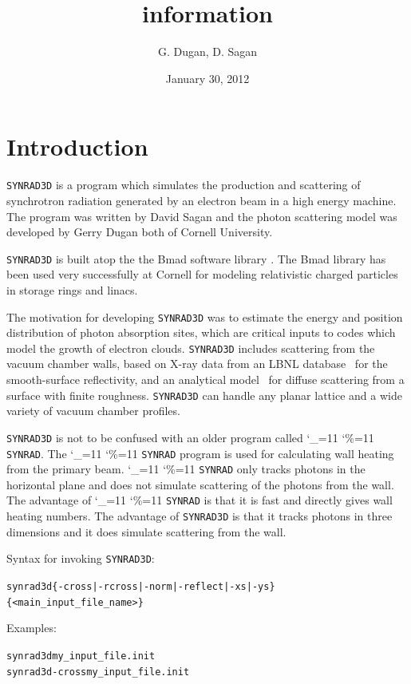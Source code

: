 \documentclass[11pt]{article}
\title{ \srthree information}
\author{G. Dugan, D. Sagan}
\date{January 30, 2012}
\newcommand{\srthree}{\texttt{SYNRAD3D}\xspace}
\newcommand\ttcmd{\begingroup\catcode`\_=11 \catcode`\%=11 \dottcmd}
\newcommand\dottcmd[1]{\texttt{#1}\endgroup}
\newcommand{\vn}{\ttcmd}
\newlength{\ExBeg}
\newlength{\ExEnd}
\newenvironment{example}
  {\vspace{\ExBeg} \begin{alltt}}
  {\end{alltt} \vspace{\ExEnd}}
\begin{document}
\maketitle

\section{Introduction} 
\label{s:intro}

\srthree is a program which simulates the production and scattering of
synchrotron radiation generated by an electron beam in a high energy
machine. The program was written by David Sagan and the photon
scattering model was developed by Gerry Dugan both of Cornell University.

\srthree is built atop the the Bmad software library
\cite{b:bmad}. The Bmad library has been used very successfully at
Cornell for modeling relativistic charged particles in storage rings
and linacs.

The motivation for developing \srthree was to estimate the energy and
position distribution of photon absorption sites, which are critical
inputs to codes which model the growth of electron clouds. \srthree
includes scattering from the vacuum chamber walls, based on X-ray data
from an LBNL database~\cite{b:henke} for the smooth-surface
reflectivity, and an analytical model~\cite{b:beckmann,b:ogilvy} for
diffuse scattering from a surface with finite roughness. \srthree can
handle any planar lattice and a wide variety of vacuum chamber
profiles.

\srthree is not to be confused with an older program called
\vn{SYNRAD}. The \vn{SYNRAD} program is used for calculating
wall heating from the primary beam.  \vn{SYNRAD} only tracks
photons in the horizontal plane and does not simulate scattering of
the photons from the wall. The advantage of \vn{SYNRAD} is that it
is fast and directly gives wall heating numbers. The advantage of
\srthree is that it tracks photons in three dimensions and it does
simulate scattering from the wall.

Syntax for invoking \srthree:
\begin{example}
  synrad3d \{-cross | -rcross | -norm | -reflect | -xs | -ys\} \{<main_input_file_name>\}
\end{example}
Examples:
\begin{example}
  synrad3d my_input_file.init
  synrad3d -cross my_input_file.init
\end{example}
\end{document}
